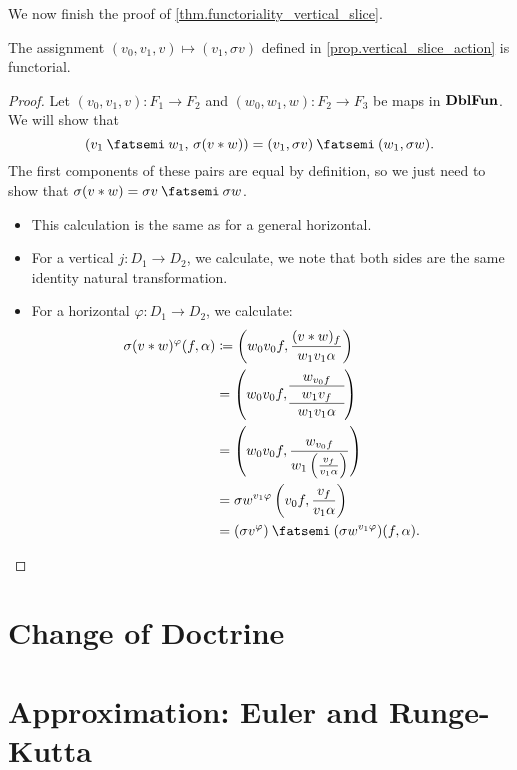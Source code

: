 \documentclass[DynamicalBook]{subfiles}
\begin{document}
We now finish the proof of \cref{thm.functoriality_vertical_slice}.
\begin{lemma}
The assignment $(v_0, v_1, v) \mapsto (v_1, \sigma v)$ defined in
\cref{prop.vertical_slice_action} is functorial.
\end{lemma}
\begin{proof}
Let $(v_0, v_1, v) : F_1 \to F_2$ and $(w_0, w_1, w) : F_2 \to F_3$ be maps in
$\textbf{DblFun}$. We will show that
$$(v_1 \then w_1,\, \sigma(v \ast w)) = (v_1, \sigma v) \then (w_1, \sigma w).$$
The first components of these pairs are equal by definition, so we just need to
show that $\sigma(v \ast w) = \sigma v \then \sigma w$.
\begin{itemize}
\item This calculation is the same as for a general horizontal. 
  \item For a vertical $j : D_1 \to D_2$, we calculate, we note that both sides
    are the same identity natural transformation.
  \item For a horizontal $\varphi : D_1 \to D_2$, we calculate:
  \begin{align*}
\sigma(v \ast w)^{\varphi}(f, \alpha) &\coloneqq \left( w_0v_0f, \frac{(v \ast w)_f}{w_1
    v_1 \alpha} \right)  \\ 
    &= \left( w_0 v_0 f, {\begin{tabular}{c} $w_{v_0 f}$\\ \hline $w_1 v_f$ \\ \hline $w_1 v_1 \alpha$ \end{tabular}} \right) \\
                              &= \left( w_0v_0 f, \frac{w_{v_0 f}}{w_1 \left( \frac{v_f}{v_1 \alpha} \right)} \right) \\
                              &= \sigma w^{v_1 \varphi} \left( v_0 f, \frac{v_f}{v_1 \alpha} \right) \\
    &= (\sigma v^{\varphi}) \then (\sigma w^{v_1 \varphi})(f, \alpha).
    \end{align*}
\end{itemize}
\end{proof}

\section{Change of Doctrine}

\section{Approximation: Euler and Runge-Kutta}
\end{document}
